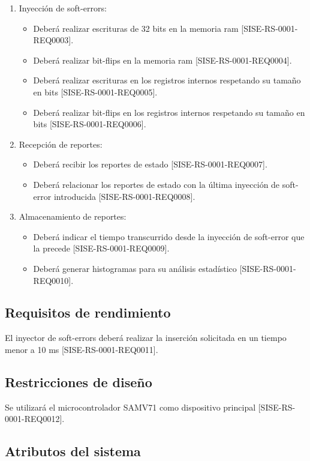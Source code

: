 \documentclass[
11pt, %
codirector, %
]{charter}
\begin{document}
\begin{enumerate}
	\item Inyección de soft-errors:
	\begin{itemize}
		\item Deberá realizar escrituras de 32 bits en la memoria ram [SISE-RS-0001-REQ0003].
		\item Deberá realizar bit-flips en la memoria ram [SISE-RS-0001-REQ0004].
		\item Deberá realizar escrituras en los registros internos respetando su tamaño en bits [SISE-RS-0001-REQ0005].
		\item Deberá realizar bit-flips en los registros internos respetando su tamaño en bits [SISE-RS-0001-REQ0006].
	\end{itemize}
	\item Recepción de reportes:
	\begin{itemize}
		\item Deberá recibir los reportes de estado [SISE-RS-0001-REQ0007].
		\item Deberá relacionar los reportes de estado con la última inyección de soft-error introducida [SISE-RS-0001-REQ0008].
	\end{itemize}
	\item Almacenamiento de reportes:
	\begin{itemize}
		\item Deberá indicar el tiempo transcurrido desde la inyección de soft-error que la precede [SISE-RS-0001-REQ0009].
		\item Deberá generar histogramas para su análisis estadístico [SISE-RS-0001-REQ0010].
	\end{itemize}
\end{enumerate}

\subsection{Requisitos de rendimiento}

El inyector de soft-errors deberá realizar la inserción solicitada en un tiempo menor a 10 ms [SISE-RS-0001-REQ0011].

\subsection{Restricciones de diseño}

Se utilizará el microcontrolador SAMV71 como dispositivo principal [SISE-RS-0001-REQ0012].

\subsection{Atributos del sistema}
\end{document}

